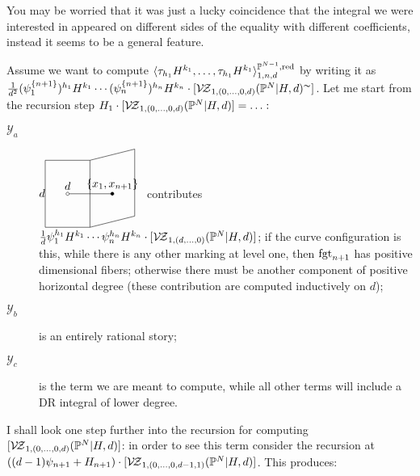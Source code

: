You may be worried that it was just a lucky coincidence that the integral we were interested in appeared on different sides of the equality with different coefficients, instead it seems to be a general feature.
\begin{rmk}
 Assume we want to compute $\langle\tau_{h_1}H^{k_1},\ldots,\tau_{h_1}H^{k_1}\rangle^{\mathbb P^{N-1},\rm{red}}_{1,n,d}$ by writing it as $\frac{1}{d^2}(\psi_1^{\{n+1\}})^{h_1}H^{k_1}\cdots(\psi_n^{\{n+1\}})^{h_n}H^{k_n}\cdot[\mathcal{V\!Z}_{1,(0,\ldots,0,d)}(\mathbb P^N|H,d)^\thicksim]$. Let me start from the recursion step $H_1\cdot[\mathcal{V\!Z}_{1,(0,\ldots,0,d)}(\mathbb P^N|H,d)]=\ldots:$
 
 \begin{description}
  \item[$\mathcal Y_a$] $d{\tikz[baseline=-3pt,scale=.7]{
\draw (2,0) node[above]{$\{x_1,x_{n+1}\}$} -- (0,0)node[above]{$d$};
\draw (2,0) circle(2pt)[fill=black];
\draw (0,0) circle(2pt)[fill=white];
\draw (-1,1.5) -- (1,1.5) -- (1,-1.5) -- (-1,-1.5) -- (-1,1.5);
\draw (1,1.5) -- (3,2) -- (3,-1) -- (1,-1.5);
}}$ contributes $\frac{1}{d}\psi_1^{h_1}H^{k_1}\cdots\psi_n^{h_n}H^{k_n}\cdot[\mathcal{V\!Z}_{1,(d,\ldots,0)}(\mathbb P^N|H,d)]$; if the curve configuration is this, while there is any other marking at level one, then $\operatorname{fgt}_{n+1}$ has positive dimensional fibers; otherwise there must be another component of positive horizontal degree (these contribution are computed inductively on $d$);
\item[$\mathcal Y_b$] is an entirely rational story;
\item[$\mathcal Y_c$] {} is the term we are meant to compute, while all other terms will include a DR integral of lower degree.
 \end{description}
I shall look one step further into the recursion for computing $[\mathcal{V\!Z}_{1,(0,\ldots,0,d)}(\mathbb P^N|H,d)]$: in order to see this term consider the recursion at $((d-1)\psi_{n+1}+H_{n+1})\cdot[\mathcal{V\!Z}_{1,(0,\ldots,0,d-1,1)}(\mathbb P^N|H,d)]$. This produces:
\end{rmk}
